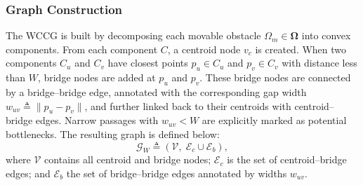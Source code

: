 \subsubsection{Graph Construction}
The WCCG is built by decomposing each movable obstacle
$\Omega_m\in\boldsymbol{\Omega}$ into convex components. From each component
$C$, a centroid node $v_c$ is created. When two components $C_u$ and $C_v$
have closest points $p_u\in C_u$ and $p_v\in C_v$ with distance less than $W$, 
bridge nodes are added at $p_u$ and $p_v$. These bridge nodes are
connected by a bridge--bridge edge, annotated with the corresponding gap width
$w_{uv}\triangleq\|p_u-p_v\|$, and further linked back to their centroids with
centroid--bridge edges. Narrow passages with $w_{uv}<W$ are explicitly marked
as potential bottlenecks. The resulting graph is defined below:
\begin{equation}\label{eq:wccg}
\mathcal{G}_W\triangleq(\mathcal{V},\; \mathcal{E}_c\cup\mathcal{E}_b),
\end{equation}
where $\mathcal{V}$ contains all centroid and bridge nodes;
$\mathcal{E}_c$ is the set of centroid--bridge edges; and $\mathcal{E}_b$ the
set of bridge--bridge edges annotated by widths $w_{uv}$.

